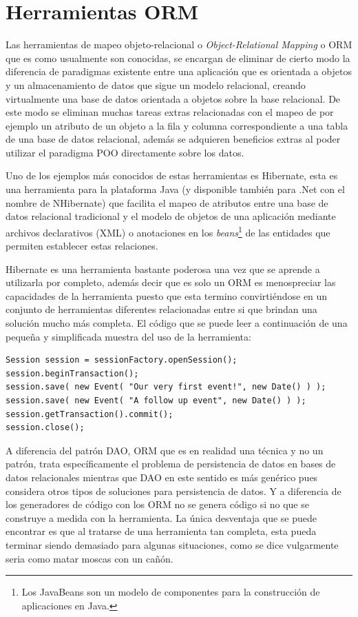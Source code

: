\section{Herramientas ORM}
%
Las herramientas de mapeo objeto-relacional o \textit{Object-Relational Mapping} o ORM que es como usualmente son conocidas, se encargan de eliminar de cierto modo la diferencia de paradigmas existente entre una aplicación que es orientada a objetos y un almacenamiento de datos que sigue un modelo relacional, creando virtualmente una base de datos orientada a objetos sobre la base relacional. De este modo se eliminan muchas tareas extras relacionadas con el mapeo de por ejemplo un atributo de un objeto a la fila y columna correspondiente a una tabla de una base de datos relacional, además se adquieren beneficios extras al poder utilizar el paradigma POO directamente sobre los datos.

Uno de los ejemplos más conocidos de estas herramientas es Hibernate, esta es una herramienta para la plataforma Java (y disponible también para .Net con el nombre de NHibernate) que facilita el mapeo de atributos entre una base de datos relacional tradicional y el modelo de objetos de una aplicación mediante archivos declarativos (XML) o anotaciones en los \textit{beans}\footnote{Los JavaBeans son un modelo de componentes para la construcción de aplicaciones en Java.} de las entidades que permiten establecer estas relaciones. 

Hibernate es una herramienta bastante poderosa una vez que se aprende a utilizarla por completo, además decir que es solo un ORM es menospreciar las capacidades de la herramienta puesto que esta termino convirtiéndose en un conjunto de herramientas diferentes relacionadas entre si que brindan una solución mucho más completa. El código que se puede leer a continuación de una pequeña y simplificada muestra del uso de la herramienta:
\begin{lstlisting}[title=Mínimo ejemplo de Hibernate: guardando datos en la DB]
Session session = sessionFactory.openSession();
session.beginTransaction();
session.save( new Event( "Our very first event!", new Date() ) );
session.save( new Event( "A follow up event", new Date() ) );
session.getTransaction().commit();
session.close();
\end{lstlisting}
A diferencia del patrón DAO, ORM que es en realidad una técnica y no un patrón, trata específicamente el problema de persistencia de datos en bases de datos relacionales mientras que DAO en este sentido es más genérico pues considera otros tipos de soluciones para persistencia de datos. Y a diferencia de los generadores de código con los ORM no se genera código si no que se construye a medida con la herramienta. La única desventaja que se puede encontrar es que al tratarse de una herramienta tan completa, esta pueda terminar siendo demasiado para algunas situaciones, como se dice vulgarmente seria como matar moscas con un cañón.
%
